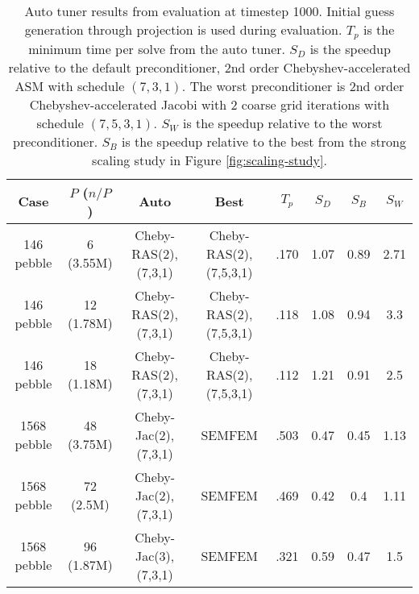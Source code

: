 \begin{table*} \footnotesize
\centering
\begin{tabular}{||c|| c| c| c| c| c| c| c||}
  \hline
  Case & $P$ ($n/P$) & Auto & Best & $T_p$ & $S_D$ & $S_B$ & $S_W$\\
  \hline\hline
  146 pebble  & 6  (3.55M) & Cheby-RAS(2),(7,3,1)  &  Cheby-RAS(2),(7,5,3,1)  & .170 & 1.07 & 0.89 & 2.71\\
  146 pebble  & 12 (1.78M) & Cheby-RAS(2),(7,3,1)  &  Cheby-RAS(2),(7,5,3,1)  & .118 & 1.08 & 0.94 & 3.3\\
  146 pebble  & 18 (1.18M) & Cheby-RAS(2),(7,3,1)  &  Cheby-RAS(2),(7,5,3,1)  & .112 & 1.21 & 0.91 & 2.5\\
  \hline
  1568 pebble & 48 (3.75M) & Cheby-Jac(2),(7,3,1)  &  SEMFEM                  & .503 & 0.47 & 0.45 & 1.13\\
  1568 pebble & 72 (2.5M)  & Cheby-Jac(2),(7,3,1)  &  SEMFEM                  & .469 & 0.42 & 0.4  & 1.11\\
  1568 pebble & 96 (1.87M) & Cheby-Jac(3),(7,3,1)  &  SEMFEM                  & .321 & 0.59 & 0.47 & 1.5\\
\hline
\end{tabular}
\caption{
  \small
  Auto tuner results from evaluation at timestep 1000.
  Initial guess generation through projection is used during evaluation.
  $T_p$ is the minimum time per solve from the auto tuner.
  $S_D$ is the speedup relative to the default preconditioner,
  2nd order Chebyshev-accelerated ASM with schedule $(7,3,1)$.
  The worst preconditioner is 2nd order Chebyshev-accelerated Jacobi with 2
  coarse grid iterations with schedule $(7,5,3,1)$.
  $S_W$ is the speedup relative to the worst preconditioner.
  $S_B$ is the speedup relative to the best from the strong scaling study
  in Figure \ref{fig:scaling-study}.
  \label{table:auto-preco-proj}}
\end{table*}